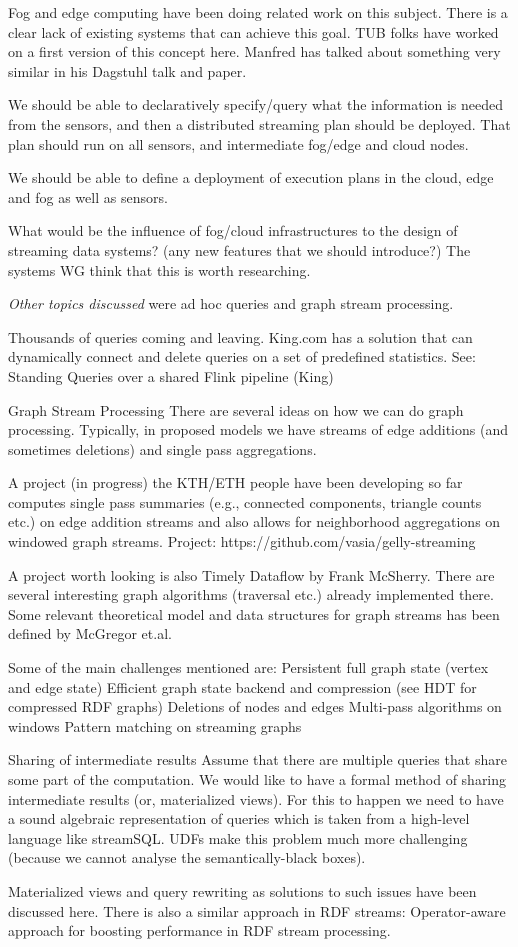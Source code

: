 Fog and edge computing have been doing related work on this subject. There is a clear lack of existing systems that can achieve this goal. TUB folks have worked on a first version of this concept here. Manfred has talked about something very similar in his Dagstuhl talk and paper. 

We should be able to declaratively specify/query what the information is needed from the sensors, and then a distributed streaming plan should be deployed. That plan should run on all sensors, and intermediate fog/edge and cloud nodes.

We should be able to define a deployment of execution plans in the cloud, edge and fog as well as sensors. 

What would be the influence of fog/cloud infrastructures to the design of streaming data systems? (any new features that we should introduce?)
The systems WG think that this is worth researching.


\emph{Other topics discussed} were ad hoc queries and graph stream processing.

Thousands of queries coming and leaving. King.com has a solution that can dynamically connect and delete queries on a set of predefined statistics. See:  Standing Queries over a shared Flink pipeline (King) 


Graph Stream Processing
There are several ideas on how we can do graph processing. Typically, in proposed models we have streams of edge additions (and sometimes deletions) and single pass aggregations.

A project (in progress) the KTH/ETH people have been developing so far computes single pass summaries (e.g., connected components, triangle counts etc.) on edge addition streams and also allows for neighborhood aggregations on windowed graph streams.
Project: https://github.com/vasia/gelly-streaming

A project worth looking is also Timely Dataflow by Frank McSherry. There are several interesting graph algorithms (traversal etc.) already implemented there.
Some relevant theoretical model and data structures for graph streams has been defined by McGregor et.al.

Some of the main challenges mentioned are:
Persistent full graph state (vertex and edge state)
Efficient graph state backend and compression (see HDT for compressed RDF graphs)
Deletions of nodes and edges
Multi-pass algorithms on windows
Pattern matching on streaming graphs

Sharing of intermediate results
Assume that there are multiple queries that share some part of the computation. We would like to have a formal method of sharing intermediate results (or, materialized views). For this to  happen we need to have a sound algebraic representation of queries which is taken from a high-level language like streamSQL. UDFs make this problem much more challenging (because we cannot analyse the semantically-black boxes).

Materialized views and query rewriting as solutions to such issues have been discussed here. There is also a similar approach in RDF streams: Operator-aware approach for boosting performance in RDF stream processing.

